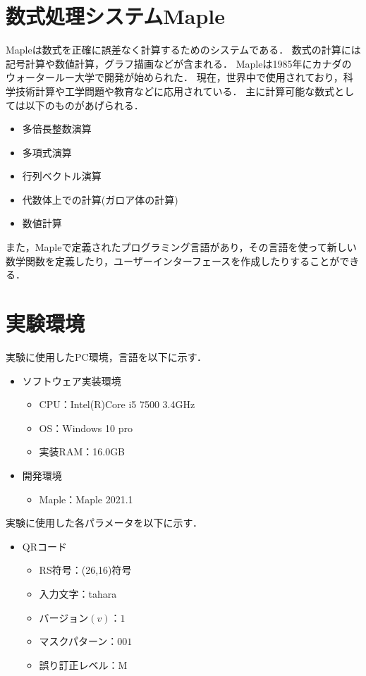 \documentclass{thesis}
\begin{document}
\section{数式処理システムMaple\cite{Maple}}
Mapleは数式を正確に誤差なく計算するためのシステムである．
数式の計算には記号計算や数値計算，グラフ描画などが含まれる．
Mapleは1985年にカナダのウォータールー大学で開発が始められた．
現在，世界中で使用されており，科学技術計算や工学問題や教育などに応用されている．
主に計算可能な数式としては以下のものがあげられる．
\begin{itemize}
\item 多倍長整数演算
\item 多項式演算
\item 行列ベクトル演算
\item 代数体上での計算(ガロア体の計算)
\item 数値計算
\end{itemize}

また，Mapleで定義されたプログラミング言語があり，その言語を使って新しい数学関数を定義したり，ユーザーインターフェースを作成したりすることができる．

\section{実験環境}

実験に使用したPC環境，言語を以下に示す．

\begin{itemize}
\setlength{\itemsep}{5mm}
 \item ソフトウェア実装環境
    \begin{itemize}
      \item CPU：Intel(R)Core i5 7500 3.4GHz
      \item OS：Windows 10 pro
      \item 実装RAM：16.0GB
     \end{itemize}
   \item 開発環境
    \begin{itemize}
      \item Maple：Maple 2021.1
   \end{itemize}
\end{itemize}

実験に使用した各パラメータを以下に示す．

\begin{itemize}
\setlength{\itemsep}{5mm}
 \item QRコード
    \begin{itemize}
      \item RS符号：(26,16)符号
      \item 入力文字：tahara
      \item バージョン$(v)$：$1$
      \item マスクパターン：$001$
      \item 誤り訂正レベル：M
      
     \end{itemize}
  \end{itemize}
\end{document}
